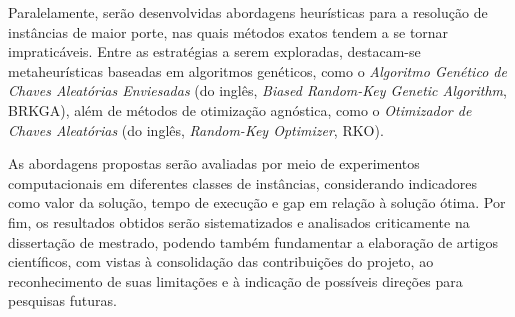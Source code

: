 Paralelamente, serão desenvolvidas abordagens heurísticas para a resolução de instâncias de maior porte, nas quais métodos exatos tendem a se tornar impraticáveis. Entre as estratégias a serem exploradas, destacam-se metaheurísticas baseadas em algoritmos genéticos, como o \textit{Algoritmo Genético de Chaves Aleatórias Enviesadas} (do inglês, \textit{Biased Random-Key Genetic Algorithm}, BRKGA), além de métodos de otimização agnóstica, como o \textit{Otimizador de Chaves Aleatórias} (do inglês, \textit{Random-Key Optimizer}, RKO).

As abordagens propostas serão avaliadas por meio de experimentos computacionais em diferentes classes de instâncias, considerando indicadores como valor da solução, tempo de execução e gap em relação à solução ótima. Por fim, os resultados obtidos serão sistematizados e analisados criticamente na dissertação de mestrado, podendo também fundamentar a elaboração de artigos científicos, com vistas à consolidação das contribuições do projeto, ao reconhecimento de suas limitações e à indicação de possíveis direções para pesquisas futuras.
